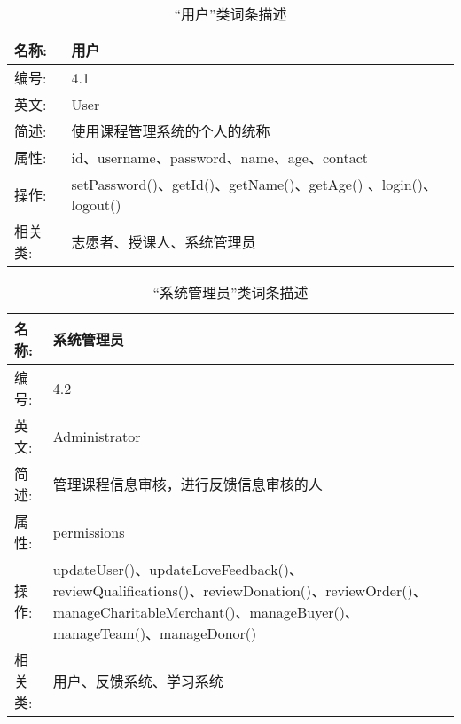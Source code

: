 \begin{table}[H]  
\caption{“用户”类词条描述}  
\begin{center}  
    \begin{tabular}{l p{11cm}} 
        \hline
        \quad 名称:  &  用户 \\
        \hline
        \quad 编号:  & 4.1 \\
        \hline
        \quad 英文:  &  User \\
        \hline
        \quad 简述:  & 使用课程管理系统的个人的统称 \\
        \hline
        \quad 属性:  & id、username、password、name、age、contact \\
        \hline
        \quad 操作:  & setPassword()、getId()、getName()、getAge() 、login()、logout() \\
        \hline
        \quad 相关类:  & 志愿者、授课人、系统管理员 \\
        \hline
    \end{tabular}
\end{center}
\end{table}


\begin{table}[H]  
\caption{“系统管理员”类词条描述}  
\begin{center}  
    \begin{tabular}{l p{11cm}} 
        \hline
        \quad 名称:  &  系统管理员 \\
        \hline
        \quad 编号:  & 4.2 \\
        \hline
        \quad 英文:  &  Administrator \\
        \hline
        \quad 简述:  & 管理课程信息审核，进行反馈信息审核的人 \\
        \hline
        \quad 属性:  & permissions \\
        \hline
        \quad 操作:  & updateUser()、updateLoveFeedback()、reviewQualifications()、reviewDonation()、reviewOrder()、manageCharitableMerchant()、manageBuyer()、manageTeam()、manageDonor()
\\
        \hline
        \quad 相关类:  & 用户、反馈系统、学习系统 \\
        \hline
    \end{tabular}
\end{center}
\end{table}

